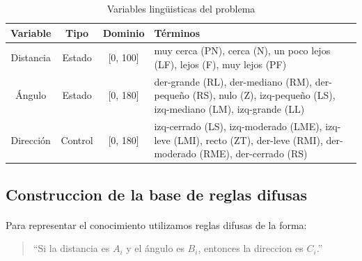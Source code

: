 \documentclass[a4paper,10pt]{article}
\begin{document}
	
\begin{table}
	\begin{center}
		 \begin{tabular}{| c | c | c |p{3.5cm}|}
			  \hline
			    Variable & Tipo & Dominio & Términos  \\ \hline
			    Distancia & Estado & [0, 100] & muy cerca (PN), \newline cerca (N), \newline un poco lejos (LF), \newline lejos (F), \newline muy lejos (PF)  \\ \hline
			    Ángulo & Estado & [0, 180] & der-grande (RL), \newline der-mediano (RM), \newline der-pequeño (RS), \newline nulo (Z), \newline izq-pequeño (LS), \newline 					izq-mediano (LM), \newline izq-grande (LL)  \\ \hline
			    Dirección & Control & [0, 180] & izq-cerrado (LS), \newline izq-moderado (LME), \newline izq-leve (LMI), \newline recto (ZT), \newline der-leve (RMI), \newline 				der-moderado (RME), \newline der-cerrado (RS) \\ \hline
		  \end{tabular}		  
		  \caption{Variables lingüisticas del problema  \label{tab:lv}}%
	\end{center}
\end{table}

\subsection{Construccion de la base de reglas difusas}\label{sub:fuzzy_rule_base}
	\paragraph{} Para representar el conocimiento  utilizamos reglas difusas de la forma:
	
	\begin{quote}
		``Si la distancia es $A_{i}$ y el ángulo es $B_{i}$, entonces la direccion es $C_{i}$.''
	\end{quote}
	
\end{document}

